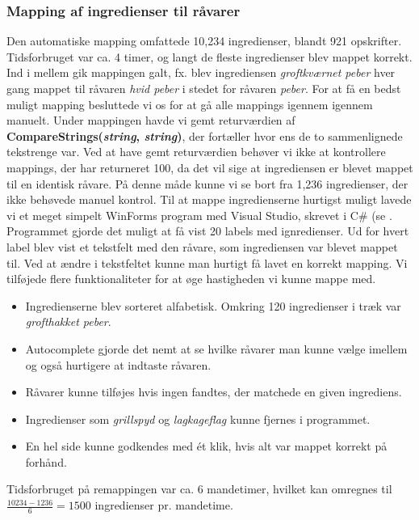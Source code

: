 \subsubsection{Mapping af ingredienser til råvarer}
Den automatiske mapping omfattede 10,234 ingredienser, blandt 921 opskrifter. Tidsforbruget var ca. 4 timer, og langt de fleste ingredienser blev mappet korrekt. Ind i mellem gik mappingen galt, fx. blev ingrediensen \textit{groftkværnet peber} hver gang mappet til råvaren \textit{hvid peber} i stedet for råvaren \textit{peber}. For at få en bedst muligt mapping besluttede vi os for at gå alle mappings igennem igennem manuelt. Under mappingen havde vi gemt returværdien af \textbf{CompareStrings(\textit{string}, \textit{string})}, der fortæller hvor ens de to sammenlignede tekstrenge var. Ved at have gemt returværdien behøver vi ikke at kontrollere mappings, der har returneret 100, da det vil sige at ingrediensen er blevet mappet til en identisk råvare. På denne måde kunne vi se bort fra 1,236 ingredienser, der ikke behøvede manuel kontrol.
Til at mappe ingredienserne hurtigst muligt lavede vi et meget simpelt WinForms program med Visual Studio, skrevet i C\# (se . Programmet gjorde det muligt at få vist 20 labels med ignredienser. Ud for hvert label blev vist et tekstfelt med den råvare, som ingrediensen var blevet mappet til. Ved at ændre i tekstfeltet kunne man hurtigt få lavet en korrekt mapping. Vi tilføjede flere funktionaliteter for at øge hastigheden vi kunne mappe med.
\begin{itemize}
\item Ingredienserne blev sorteret alfabetisk. Omkring 120 ingredienser i træk var \textit{grofthakket peber}.
\item Autocomplete gjorde det nemt at se hvilke råvarer man kunne vælge imellem og også hurtigere at indtaste råvaren.
\item Råvarer kunne tilføjes hvis ingen fandtes, der matchede en given ingrediens.
\item Ingredienser som \fx \textit{grillspyd} og \textit{lagkageflag} kunne fjernes i programmet.
\item En hel side kunne godkendes med ét klik, hvis alt var mappet korrekt på forhånd.
\end{itemize}

Tidsforbruget på remappingen var ca. 6 mandetimer, hvilket kan omregnes til $\frac{10234 - 1236}{6} = 1500$ ingredienser pr. mandetime.
